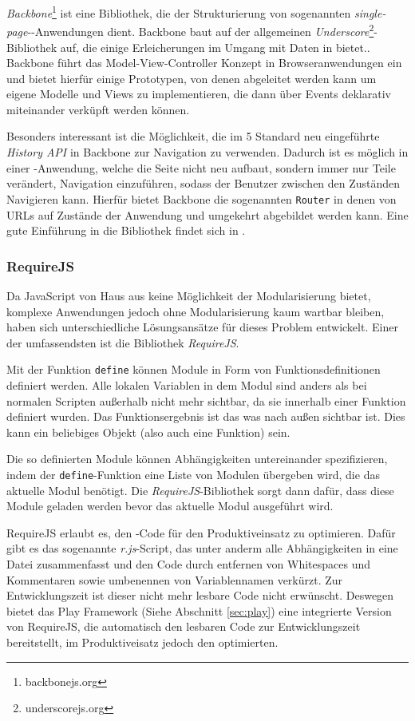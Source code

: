 \textit{Backbone}\footnote{backbonejs.org} ist eine Bibliothek, die der Strukturierung von
sogenannten \textit{single-page}--Anwendungen dient. Backbone baut auf der allgemeinen
\textit{Underscore}\footnote{underscorejs.org}-Bibliothek auf, die einige Erleicherungen im Umgang
mit Daten in  bietet.. Backbone führt das Model-View-Controller Konzept in
Browseranwendungen ein und bietet hierfür einige Prototypen, von denen abgeleitet werden kann um
eigene Modelle und Views zu implementieren, die dann über Events deklarativ miteinander verküpft
werden können.

Besonders interessant ist die Möglichkeit, die im 5 Standard neu eingeführte
\textit{History API} in Backbone zur Navigation zu verwenden. Dadurch ist es möglich in einer
-Anwendung, welche die Seite nicht neu aufbaut, sondern immer nur Teile verändert,
Navigation einzuführen, sodass der Benutzer zwischen den Zuständen Navigieren kann. Hierfür bietet
Backbone die sogenannten \texttt{Router} in denen von URLs auf Zustände der Anwendung und umgekehrt
abgebildet werden kann. Eine gute Einführung in die Bibliothek findet sich in \cite{backbone}.

\subsubsection{RequireJS}
\label{sec:requirejs}

Da JavaScript von Haus aus keine Möglichkeit der Modularisierung bietet, komplexe Anwendungen
jedoch ohne Modularisierung kaum wartbar bleiben, haben sich unterschiedliche Lösungsansätze für
dieses Problem entwickelt. Einer der  umfassendsten ist die Bibliothek \textit{RequireJS}.

Mit der Funktion \texttt{define} können Module in Form von Funktionsdefinitionen  definiert werden.
Alle lokalen Variablen in dem Modul sind anders als bei  normalen Scripten außerhalb nicht mehr
sichtbar, da sie innerhalb einer  Funktion definiert wurden. Das Funktionsergebnis ist das was nach
außen sichtbar  ist. Dies kann ein beliebiges Objekt (also auch eine Funktion) sein.

Die so definierten Module können Abhängigkeiten untereinander spezifizieren,  indem der
\texttt{define}-Funktion eine Liste von Modulen übergeben wird, die  das aktuelle Modul benötigt.
Die \textit{RequireJS}-Bibliothek sorgt dann dafür,  dass diese Module geladen werden bevor das
aktuelle Modul ausgeführt wird.

RequireJS erlaubt es, den  -Code für den Produktiveinsatz zu optimieren. Dafür
gibt es  das sogenannte \textit{r.js}-Script, das unter anderm alle Abhängigkeiten in eine Datei
zusammenfasst und den Code durch entfernen von Whitespaces und Kommentaren  sowie umbenennen
von Variablennamen verkürzt. Zur Entwicklungszeit ist dieser nicht mehr lesbare Code nicht
erwünscht. Deswegen bietet das Play Framework (Siehe Abschnitt \ref{sec:play}) eine integrierte
Version von RequireJS, die automatisch den lesbaren Code zur Entwicklungszeit  bereitstellt, im
Produktiveisatz jedoch den optimierten.